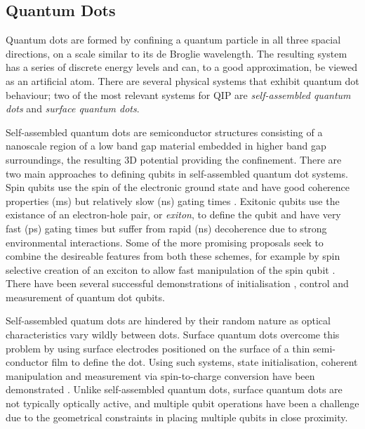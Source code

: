 \subsection{Quantum Dots}

Quantum dots are formed by confining a quantum particle in all three spacial directions, on a scale similar to its de Broglie wavelength. The resulting system has a series of discrete energy levels and can, to a good approximation, be viewed as an artificial atom. There are several physical systems that exhibit quantum dot behaviour; two of the most relevant systems for QIP are \textit{self-assembled quantum dots} and \textit{surface quantum dots}.

Self-assembled quantum dots are semiconductor structures consisting of a nanoscale region of a low band gap material embedded in higher band gap surroundings, the resulting 3D potential providing the confinement.  There are two main approaches to defining qubits in self-assembled quantum dot systems. Spin qubits use the spin of the electronic ground state and have good coherence properties (ms) \cite{Kroutvar:2004p4951, Greilich:2006p5031} but relatively slow (ns) gating times \cite{Burkard:1999p5057}. Exitonic qubits use the existance of an electron-hole pair, or \textit{exiton}, to define the qubit and have very fast (ps) gating times \cite{Li:2003p5178} but suffer from rapid (ns) decoherence due to strong environmental interactions. Some of the more promising proposals seek to combine the desireable features from both these schemes, for example by spin selective creation of an exciton to allow fast manipulation of the spin qubit \cite{Calarco:2003p5363, Chen:2000p5290, Yokoi:2005p5390}. There have been several successful demonstrations of initialisation \cite{atature_quantum_dot_06, gerardot_dot_08}, control \cite{quantum_dot_control_08} and measurement \cite{quantum_dot_measurement_06} of quantum dot qubits.

Self-assembled quatum dots are hindered by their random nature as optical characteristics vary wildly between dots. Surface quantum dots overcome this problem by using surface electrodes positioned on the surface of a thin semi-conductor film to define the dot. Using such systems, state initialisation, coherent manipulation and measurement via spin-to-charge conversion have been demonstrated \cite{quantum_dot_nanowires_example}. Unlike self-assembled quantum dots, surface quantum dots are not typically optically active, and multiple qubit operations have been a challenge due to the geometrical constraints in placing multiple qubits in close proximity.

